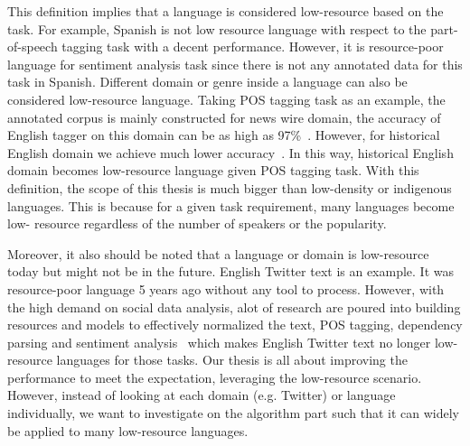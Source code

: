 \documentclass[12pt,twoside,final,hidelinks]{ltthesis}
\theoremstyle{definition}
\begin{document}
This definition implies that a language is considered low-resource based on the task. 
For example, Spanish is not low resource language with respect to 
the part-of-speech tagging task with a decent performance. However, it is 
resource-poor language for sentiment analysis task 
since  there is not any annotated data for this task in Spanish. 
Different domain or genre inside a language can also be considered low-resource 
language. Taking POS tagging task as an example, the annotated corpus is mainly 
constructed for news wire domain, the accuracy of English tagger on this domain 
can be as high as 97\%~\cite{Toutanova:2003}. However, for historical English 
domain we achieve much lower accuracy~\cite{yang-eisenstein:2016:N16-1}. In this way, 
historical English domain becomes low-resource language given POS tagging task. 
With this definition, the scope of this thesis is much bigger than low-density or indigenous languages. 
This is because for a given task requirement, many languages become low-
resource regardless of the number of speakers or the popularity.%

Moreover, it also should be noted that a language or domain is low-resource today but might not be in the future. English Twitter text is an example. It was resource-poor language 5 years ago without any tool to process. However, with the high demand on social data analysis, alot of research are poured into  building resources and models to effectively normalized the text, POS tagging, dependency parsing and sentiment analysis~\cite{han-baldwin:2011:ACL-HLT2011,gimpel-EtAl:2011:ACL-HLT2011,kong-EtAl:2014:EMNLP2014,Agarwal:2011:SAT:2021109.2021114} which makes English Twitter text no longer low-resource languages for those tasks. Our thesis is all about improving the performance to meet the expectation, leveraging the low-resource scenario. However, instead of looking at each domain (e.g. Twitter) or language individually, we want to investigate on the algorithm part such that it can widely be applied to many low-resource languages.   
\end{document}
